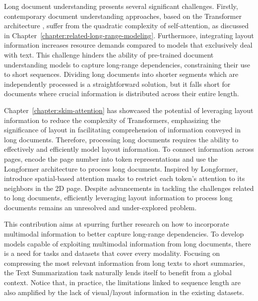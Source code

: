 

\newpage

\minitoc
{}

Long document understanding presents several significant challenges. Firstly, contemporary document understanding approaches, based on the Transformer architecture \citep{vaswani2017attention}, suffer from the quadratic complexity of self-attention, as discussed in Chapter~\ref{chapter:related-long-range-modeling}. Furthermore, integrating layout information increases resource demands compared to models that exclusively deal with text. This challenge hinders the ability of pre-trained document understanding models to capture long-range dependencies, constraining their use to short sequences. Dividing long documents into shorter segments which are independently processed is a straightforward solution, but it falls short for documents where crucial information is distributed across their entire length.

Chapter~\ref{chapter:skim-attention} has showcased the potential of leveraging layout information to reduce the complexity of Transformers, emphasizing the significance of layout in facilitating comprehension of information conveyed in long documents. Therefore, processing long documents requires the ability to effectively and efficiently model layout information. To connect information across pages, \citet{pramanik2020towards} encode the page number into token representations and use the Longformer architecture \citep{beltagy2020longformer} to process long documents. Inspired by Longformer, \citet{pham2022understanding} introduce spatial-based attention masks to restrict each token's attention to its neighbors in the 2D page. Despite advancements in tackling the challenges related to long documents, efficiently leveraging layout information to process long documents remains an unresolved and under-explored problem.

This contribution aims at spurring further research on how to incorporate multimodal information to better capture long-range dependencies. To develop models capable of exploiting multimodal information from long documents, there is a need for tasks and datasets that cover every modality. Focusing on compressing the most relevant information from long texts to short summaries, the Text Summarization task naturally lends itself to benefit from a global context. Notice that, in practice, the limitations linked to sequence length are also amplified by the lack of visual/layout information in the existing datasets. 

